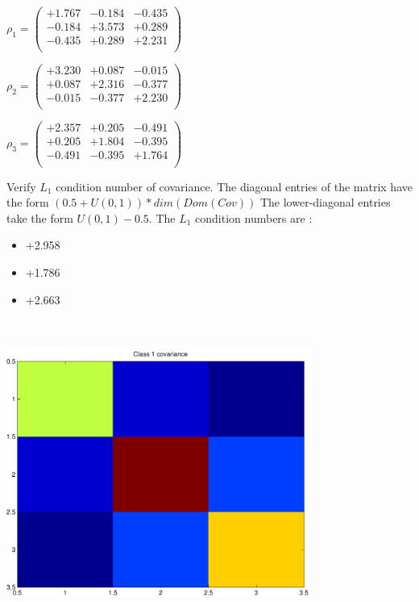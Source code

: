 \documentclass[9pt]{article}
\theoremstyle{plain}
\theoremstyle{definition}
\theoremstyle{remark}
\numberwithin{equation}{section}
\begin{document}
$\rho_1 = \left(
\begin{array}{
ccc}
+1.767 & -0.184 & -0.435 \\
-0.184 & +3.573 & +0.289 \\
-0.435 & +0.289 & +2.231 \\
\end{array}
\right)$ \newline 

$\rho_2 = \left(
\begin{array}{
ccc}
+3.230 & +0.087 & -0.015 \\
+0.087 & +2.316 & -0.377 \\
-0.015 & -0.377 & +2.230 \\
\end{array}
\right)$ \newline 

$\rho_3 = \left(
\begin{array}{
ccc}
+2.357 & +0.205 & -0.491 \\
+0.205 & +1.804 & -0.395 \\
-0.491 & -0.395 & +1.764 \\
\end{array}
\right)$ \newline 

Verify $L_1$ condition number of covariance. The diagonal entries of the matrix have the form $(0.5 + U(0,1) )*dim(Dom(Cov))$
The lower-diagonal entries take the form $U(0,1) - 0.5$. 
The $L_1$ condition numbers are :
\begin{itemize}
\item +2.958
\item +1.786
\item +2.663
\end{itemize}
\includegraphics[width=10.0cm,height=10.0cm]{rv1_corr.pdf}
\end{document}
